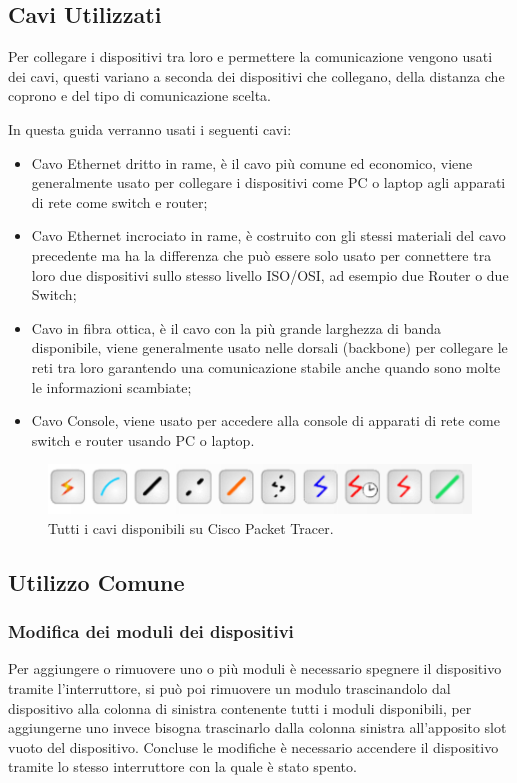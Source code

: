 \subsection{Cavi Utilizzati}
Per collegare i dispositivi tra loro e permettere la comunicazione vengono usati dei cavi, questi variano a seconda dei dispositivi che collegano, della distanza che coprono e del tipo di comunicazione scelta.

\smallskip

\noindent In questa guida verranno usati i seguenti cavi:

\begin{itemize}
    \item Cavo Ethernet dritto in rame, è il cavo più comune ed economico, viene generalmente usato per collegare i dispositivi come PC o laptop agli apparati di rete come switch e router;
    \item Cavo Ethernet incrociato in rame, è costruito con gli stessi materiali del cavo precedente ma ha la differenza che può essere solo usato per connettere tra loro due dispositivi sullo stesso livello ISO/OSI, ad esempio due Router o due Switch;
    \item Cavo in fibra ottica, è il cavo con la più grande larghezza di banda disponibile, viene generalmente usato nelle dorsali (backbone) per collegare le reti tra loro garantendo una comunicazione stabile anche quando sono molte le informazioni scambiate;
    \item Cavo Console, viene usato per accedere alla console di apparati di rete come switch e router usando PC o laptop.
\end{itemize}

\begin{figure}[htbp]
    \centering
    \includegraphics[scale=.4]{images/02.packet-tracer/cavi.png}
    \caption{Tutti i cavi disponibili su Cisco Packet Tracer.}
\end{figure}

\subsection{Utilizzo Comune}

\subsubsection{Modifica dei moduli dei dispositivi}
Per aggiungere o rimuovere uno o più moduli è necessario spegnere il dispositivo tramite l'interruttore, si può poi rimuovere un modulo trascinandolo dal dispositivo alla colonna di sinistra contenente tutti i moduli disponibili, per aggiungerne uno invece bisogna trascinarlo dalla colonna sinistra all'apposito slot vuoto del dispositivo. Concluse le modifiche è necessario accendere il dispositivo tramite lo stesso interruttore con la quale è stato spento.

